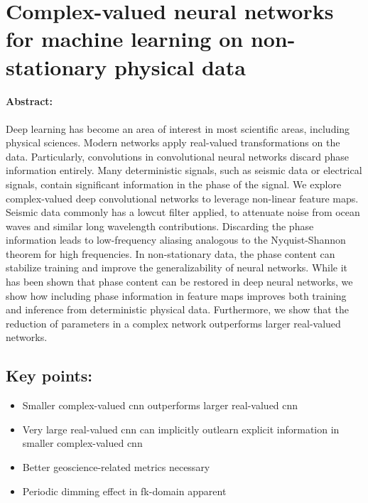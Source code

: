 \section{Complex-valued neural networks for machine learning on non-stationary physical data}

\paragraph{Abstract:} Deep learning has become an area of interest in most scientific areas, including physical sciences. Modern networks apply real-valued transformations on the data. Particularly, convolutions in convolutional neural networks discard phase information entirely. Many deterministic signals, such as seismic data or electrical signals, contain significant information in the phase of the signal. We explore complex-valued deep convolutional networks to leverage non-linear feature maps. Seismic data commonly has a lowcut filter applied, to attenuate noise from ocean waves and similar long wavelength contributions. Discarding the phase information leads to low-frequency aliasing analogous to the Nyquist-Shannon theorem for high frequencies. In non-stationary data, the phase content can stabilize training and improve the generalizability of neural networks. While it has been shown that phase content can be restored in deep neural networks, we show how including phase information in feature maps improves both training and inference from deterministic physical data. Furthermore, we show that the reduction of parameters in a complex network outperforms larger real-valued networks.
\vfill
\subsection*{Key points:}
\begin{itemize}
    \item Smaller complex-valued \acl{cnn} outperforms larger real-valued \acl{cnn}
    \item Very large real-valued \ac{cnn} can implicitly outlearn explicit information in smaller complex-valued \ac{cnn}
    \item Better geoscience-related metrics necessary
    \item Periodic dimming effect in \acl{fk}-domain apparent
\end{itemize}
\vfill
{\vfill\hfill\newline{}}

